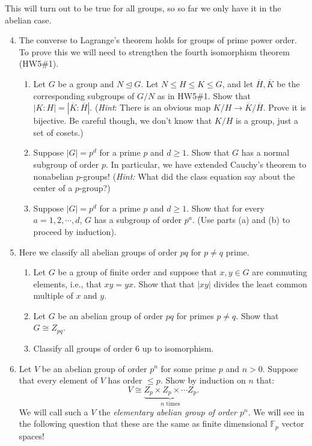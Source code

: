 \documentclass[11pt]{article}
\newcommand{\bF}{\mathbb{F}}
\begin{document}
    This will turn out to be true for all groups, so so far we only have it in the abelian case.
    \begin{enumerate}
    \setcounter{enumi}{3}
    \item The converse to Lagrange's theorem holds for groups of prime power order.  To prove this we will need to strengthen the fourth isomorphism theorem (HW5\#1).
  \begin{enumerate}
    \item Let $G$ be a group and $N\unlhd G$.  Let $N\le H\le K\le G$, and let $\overline H,\overline K$ be the corresponding subgroups of $G/N$ as in HW5\#1.  Show that $|K:H| = |\overline K:\overline H|$.  (\textit{Hint}: There is an obvious map $K/H\to\overline K/\overline H$.  Prove it is bijective.  Be careful though, we don't know that $K/H$ is a group, just a set of cosets.)
    \item Suppose $|G| = p^d$ for a prime $p$ and $d\ge 1$.  Show that $G$ has a normal subgroup of order $p$.  In particular, we have extended Cauchy's theorem to nonabelian $p$-groups!  (\textit{Hint:} What did the class equation say about the center of a $p$-group?)
    \item Suppose $|G| = p^d$ for a prime $p$ and $d\ge1$.  Show that for every $a = 1,2,\cdots,d$, $G$ has a subgroup of order $p^a$.  (Use parts (a) and (b) to proceed by induction).
  \end{enumerate}
  \item Here we classify all abelian groups of order $pq$ for $p\not=q$ prime.
  \begin{enumerate}
  \item Let $G$ be a group of finite order and suppose that $x,y\in G$ are commuting elements, i.e., that $xy = yx$.  Show that that $|xy|$ divides the least common multiple of $x$ and $y$.
  \item Let $G$ be an abelian group of order $pq$ for primes $p\not=q$.  Show that $G\cong Z_{pq}$.
  \item Classify all groups of order 6 up to isomorphism.
  \end{enumerate}
  \item Let $V$ be an abelian group of order $p^n$ for some prime $p$ and $n>0$.  Suppose that every element of $V$ has order $\le p$.  Show by induction on $n$ that:
  \[V\cong \underbrace{Z_p\times Z_p\times\cdots Z_p}_{n\text{ times}}.\]
  We will call such a $V$ the \textit{elementary abelian group of order $p^n$}.  We will see in the following question that these are the same as finite dimensional $\bF_p$ vector spaces!

\end{enumerate}
\end{document}
